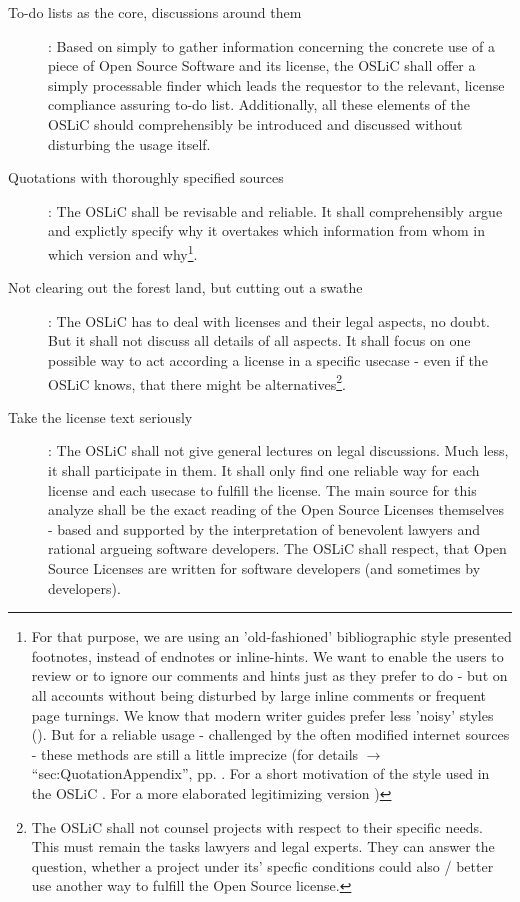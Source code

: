 \begin{description}
  \item[To-do lists as the core, discussions around them]: Based on simply to
  gather information concerning the concrete use of a piece of Open Source
  Software and its license, the OSLiC shall offer a simply processable finder
  which leads the requestor to the relevant, license compliance assuring to-do
  list. Additionally, all these elements of the OSLiC should comprehensibly
  be introduced and discussed without disturbing the usage itself.

  \item[Quotations with thoroughly specified sources]\label{QuotationPrinciple}:
  The OSLiC shall be revisable and reliable. It shall comprehensibly argue and
  explictly specify why it overtakes which information from whom in which
  version and why\footnote{For that purpose, we are using an 'old-fashioned'
  bibliographic style presented footnotes, instead of endnotes or inline-hints.
  We want to enable the users to review or to ignore our comments and hints just
  as they prefer to do - but on all accounts without being disturbed by large
  inline comments or frequent page turnings. We know that modern writer guides
  prefer less 'noisy' styles (\cite[pars pro toto cf.][\nopage
  passim]{Mla2009a}). But for a reliable usage - challenged by the often
  modified internet sources - these methods are still a little imprecize (for
  details $\rightarrow$ \enquote{sec:QuotationAppendix}, pp.
  \pageref{sec:QuotationAppendix} . For a short motivation of the style used in
  the OSLiC \cite[cf.][\nopage passim]{Reincke2012a}. For a more elaborated
  legitimizing version \cite[cf.][\nopage passim]{Reincke2012b}) }.

 \item[Not clearing out the forest land, but cutting out a swathe]: The OSLiC
  has to deal with licenses and their legal aspects, no doubt. But it shall not
  discuss all details of all aspects. It shall focus on one possible way to act
  according a license in a specific usecase - even if the OSLiC knows, that
  there might be alternatives\footnote{The OSLiC shall not counsel projects with
  respect to their specific needs. This must remain the tasks lawyers and legal
  experts. They can answer the question, whether a project under its' specfic
  conditions could also / better use another way to fulfill the Open Source
  license.}.
  
  \item[Take the license text seriously]: The OSLiC shall not give general
  lectures on legal discussions. Much less, it shall participate in them. It
  shall only find one reliable way for each license and each usecase to fulfill
  the license. The main source for this analyze shall be the exact reading of
  the Open Source Licenses themselves - based and supported by the
  interpretation of benevolent lawyers and rational argueing software
  developers. The OSLiC shall respect, that Open Source Licenses are written for
  software developers (and sometimes by developers).
  

\end{description}
